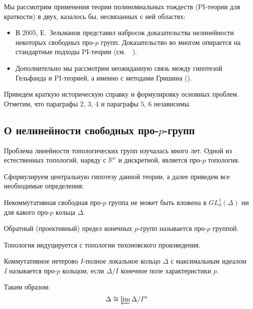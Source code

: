 Мы рассмотрим применения теории полиномиальных тождеств (PI-теории для краткости) в двух, казалось бы, несвязанных с ней областях:
\begin{itemize}
    \item В 2005, Е.\ Зельманов представил набросок доказательства нелинейности некоторых свободных про-$p$ групп.
    Доказательство во многом опирается на стандартные подходы PI-теории (см.\ ~\cite{Zelmanov1}).
    \item Дополнительно мы рассмотрим неожиданную связь между гипотезой Гельфанда и PI-теорией, а именно с методами Гришина (\cite{Grishin}).
\end{itemize}

Приведем краткую историческую справку и формулировку основных проблем.
Отметим, что параграфы 2, 3, 4 и параграфы 5, 6 независимы.

\subsection{О нелинейности свободных про-$p$-групп}\label{subsec:introduction-pro-p}
Проблема линейности топологических групп изучалась много лет.
Одной из естественных топологий, наряду с $\mathbb{R}^n$ и дискретной, является про-$p$ топология.

Сформулируем центральную гипотезу данной теории, а далее приведем все необходимые определения:

\vskip 0.1in\noindent
\begin{conjecture}
    Некоммутативная свободная про-$p$ группа не может быть вложена в $GL^1_d(\Delta)$ ни для какого про-$p$ кольца $\Delta$.
\end{conjecture}
\vskip 0.1in\noindent

\vskip 0.1in\noindent
\begin{definition}
    Обратный (проективный) предел конечных $p$-групп называется про-$p$ группой.
\end{definition}
\vskip 0.1in\noindent
Топология индуцируется с топологии тихоновского произведения.

\vskip 0.1in\noindent
\begin{definition}
    Коммутативное нетерово $I$-полное локальное кольцо $\Delta$ с максимальным идеалом $I$ называется про-$p$ кольцом, если $\Delta/I$ конечное поле характеристики $p$.
\end{definition}
\vskip 0.1in\noindent

Таким образом:
\[
    \Delta \cong \varprojlim \Delta/I^n
\]

